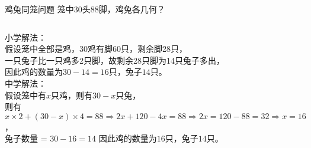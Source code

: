 \documentclass[aspectratio=169]{ctexbeamer} %
\date{\today}
\begin{document}
\begin{frame}[t]{鸡兔同笼问题}
笼中30头88脚，鸡兔各几何？\\
\pause
\begin{columns}
小学解法：\\
假设笼中全部是鸡，30鸡有脚60只，剩余脚28只，\\
一只兔子比一只鸡多2只脚，故剩余28只脚为14只兔子多出，\\
因此鸡的数量为\alert{$30 - 14 = 16$}只，兔子\alert{$14$}只。\\
\vspace{1em}
中学解法：\\
假设笼中有$x$只鸡，则有$30-x$只兔，\\
则有$x \times 2 + (30 - x) \times 4 = 88 \Rightarrow 2x + 120 - 4x = 88 \Rightarrow 2x = 120 - 88 = 32 \Rightarrow x = 16$，\\
兔子数量 = $30 - 16 = 14$
因此鸡的数量为\alert{$16$}只，兔子\alert{$14$}只。
\end{columns}
\end{frame}
\end{document}
